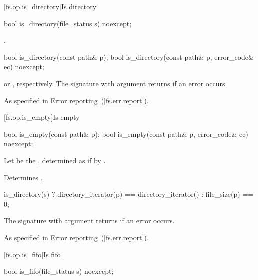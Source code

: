 [fs.op.is_directory]{Is directory}

\begin{itemdecl}
bool is_directory(file_status s) noexcept;
\end{itemdecl}

\begin{itemdescr}
\pnum
\returns {}.
\end{itemdescr}

\begin{itemdecl}
bool is_directory(const path& p);
bool is_directory(const path& p, error_code& ec) noexcept;
\end{itemdecl}

\begin{itemdescr}
\pnum
\returns {} or ,
  respectively. The signature with argument
   returns  if an error occurs.

\pnum
\throws As specified in Error reporting~(\ref{fs.err.report}).
\end{itemdescr}


[fs.op.is_empty]{Is empty}

\begin{itemdecl}
bool is_empty(const path& p);
bool is_empty(const path& p, error_code& ec) noexcept;
\end{itemdecl}

\begin{itemdescr}
\pnum
Let  be the , determined
as if by .

\pnum
\effects Determines .

\pnum
\returns
\begin{codeblock}
is_directory(s) ? directory_iterator(p) == directory_iterator() : file_size(p) == 0;
\end{codeblock}
The signature with argument  returns  if
  an error occurs.

\pnum
\throws As specified in Error reporting~(\ref{fs.err.report}).
\end{itemdescr}


[fs.op.is_fifo]{Is fifo}

\begin{itemdecl}
bool is_fifo(file_status s) noexcept;
\end{itemdecl}

